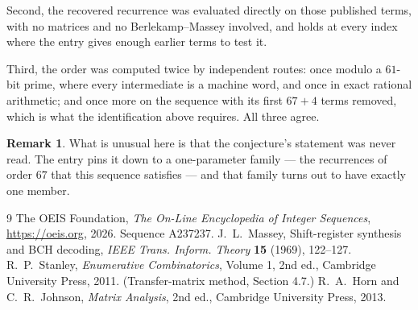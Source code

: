 \documentclass[11pt,a4paper]{article}
\theoremstyle{plain}
\theoremstyle{definition}
\newtheorem{remark}[theorem]{Remark}
\begin{document}
Second, the recovered recurrence was evaluated directly on those published terms, with no
matrices and no Berlekamp--Massey involved, and holds at every index where the entry gives
enough earlier terms to test it.

Third, the order was computed twice by independent routes: once modulo a $61$-bit prime, where
every intermediate is a machine word, and once in exact rational arithmetic; and once more on
the sequence with its first $67+4$ terms removed, which is what the identification above
requires. All three agree.

\begin{remark}
What is unusual here is that the conjecture's statement was never read. The entry pins it down
to a one-parameter family --- the recurrences of order $67$ that this sequence satisfies
--- and that family turns out to have exactly one member.
\end{remark}

\begin{thebibliography}{9}
 The OEIS Foundation, \emph{The On-Line Encyclopedia of Integer
Sequences}, \url{https://oeis.org}, 2026. Sequence A237237.
 J.~L.~Massey, Shift-register synthesis and BCH decoding, \emph{IEEE
Trans. Inform. Theory} \textbf{15} (1969), 122--127.
 R.~P.~Stanley, \emph{Enumerative Combinatorics}, Volume 1, 2nd ed.,
Cambridge University Press, 2011. (Transfer-matrix method, Section 4.7.)
 R.~A.~Horn and C.~R.~Johnson, \emph{Matrix Analysis}, 2nd ed., Cambridge
University Press, 2013.
\end{thebibliography}
\end{document}
